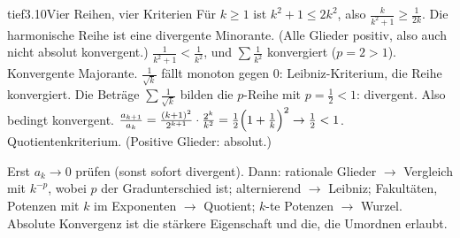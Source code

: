 \begin{loesungkarte}{tief}{3.10}{Vier Reihen, vier Kriterien}
Für $k\ge1$ ist $k^{2} + 1\le2k^{2}$, also $\frac k{k^{2} + 1}\ge\frac1{2k}$. Die harmonische Reihe ist eine divergente Minorante. (Alle Glieder positiv, also auch nicht absolut konvergent.)
$\frac1{k^{2} + 1} < \frac1{k^{2}}$, und $\sum\frac1{k^{2}}$ konvergiert ($p = 2 > 1$). Konvergente Majorante.
$\frac1{\sqrt k}$ fällt monoton gegen $0$: Leibniz-Kriterium, die Reihe konvergiert. Die Beträge $\sum\frac1{\sqrt k}$ bilden die $p$-Reihe mit $p = \frac12 < 1$: divergent. Also bedingt konvergent.
$\frac{a_{k+1}}{a_k} = \frac{(k + 1)^{2}}{2^{k+1}}\cdot\frac{2^{k}}{k^{2}} = \frac12\Bigl(1 + \frac1k\Bigr)^{2}\to\frac12 < 1$. Quotientenkriterium. (Positive Glieder: absolut.)
\begin{mitnehmen}\kastentext
Erst $a_k\to0$ prüfen (sonst sofort divergent). Dann: rationale Glieder $\to$ Vergleich mit $k^{-p}$, wobei $p$ der Gradunterschied ist; alternierend $\to$ Leibniz; Fakultäten, Potenzen mit $k$ im Exponenten $\to$ Quotient; $k$-te Potenzen $\to$ Wurzel. Absolute Konvergenz ist die stärkere Eigenschaft und die, die Umordnen erlaubt.
\end{mitnehmen}
\end{loesungkarte}

